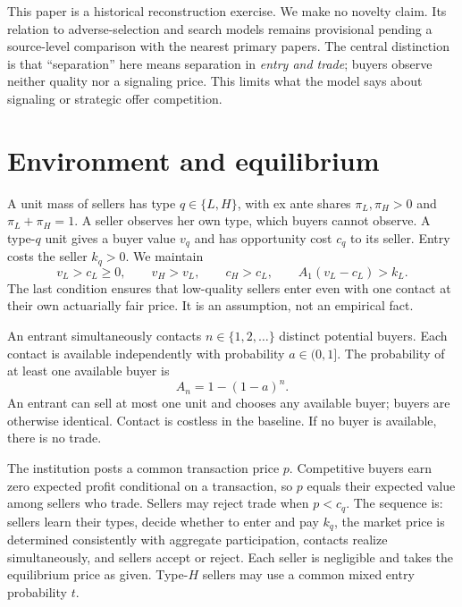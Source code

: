 \documentclass[11pt]{article}
\begin{document}
This paper is a historical reconstruction exercise. We make no novelty claim. Its relation to adverse-selection and search models remains provisional pending a source-level comparison with the nearest primary papers. The central distinction is that ``separation'' here means separation in \emph{entry and trade}; buyers observe neither quality nor a signaling price. This limits what the model says about signaling or strategic offer competition.

\section{Environment and equilibrium}\label{sec:model}

A unit mass of sellers has type $q\in\{L,H\}$, with ex ante shares $\pi_L,\pi_H>0$ and $\pi_L+\pi_H=1$. A seller observes her own type, which buyers cannot observe. A type-$q$ unit gives a buyer value $v_q$ and has opportunity cost $c_q$ to its seller. Entry costs the seller $k_q>0$. We maintain
\begin{equation}\label{eq:primitive}
 v_L>c_L\geq 0,\qquad v_H>v_L,\qquad c_H>c_L,\qquad
 A_1(v_L-c_L)>k_L.
\end{equation}
The last condition ensures that low-quality sellers enter even with one contact at their own actuarially fair price. It is an assumption, not an empirical fact.

An entrant simultaneously contacts $n\in\{1,2,\ldots\}$ distinct potential buyers. Each contact is available independently with probability $a\in(0,1]$. The probability of at least one available buyer is
\begin{equation}\label{eq:A}
 A_n=1-(1-a)^n.
\end{equation}
An entrant can sell at most one unit and chooses any available buyer; buyers are otherwise identical. Contact is costless in the baseline. If no buyer is available, there is no trade.

The institution posts a common transaction price $p$. Competitive buyers earn zero expected profit conditional on a transaction, so $p$ equals their expected value among sellers who trade. Sellers may reject trade when $p<c_q$. The sequence is: sellers learn their types, decide whether to enter and pay $k_q$, the market price is determined consistently with aggregate participation, contacts realize simultaneously, and sellers accept or reject. Each seller is negligible and takes the equilibrium price as given. Type-$H$ sellers may use a common mixed entry probability $t$.
\end{document}
